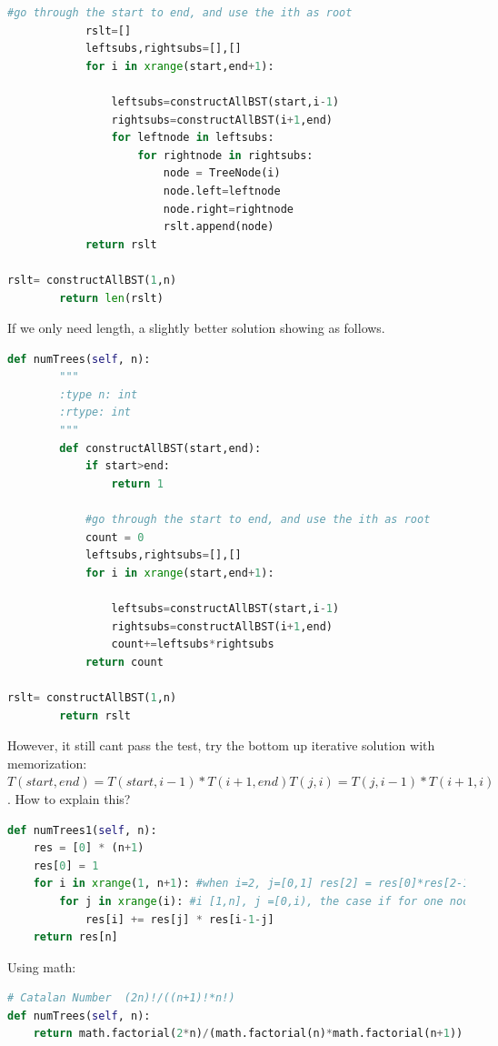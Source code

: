 \documentclass[../main.tex]{subfiles}
\begin{document}
\begin{examples}[resume]
\begin{lstlisting}[language = Python]
            #go through the start to end, and use the ith as root
            rslt=[]
            leftsubs,rightsubs=[],[]
            for i in xrange(start,end+1):
                
                leftsubs=constructAllBST(start,i-1)
                rightsubs=constructAllBST(i+1,end)
                for leftnode in leftsubs:
                    for rightnode in rightsubs:
                        node = TreeNode(i)
                        node.left=leftnode
                        node.right=rightnode
                        rslt.append(node)
            return rslt

rslt= constructAllBST(1,n)
        return len(rslt)
        \end{lstlisting}

If we only need length, a slightly better solution showing as follows.
\begin{lstlisting}[language = Python]
def numTrees(self, n):
        """
        :type n: int
        :rtype: int
        """
        def constructAllBST(start,end):
            if start>end:
                return 1
            
            #go through the start to end, and use the ith as root
            count = 0
            leftsubs,rightsubs=[],[]
            for i in xrange(start,end+1):
                
                leftsubs=constructAllBST(start,i-1)
                rightsubs=constructAllBST(i+1,end)
                count+=leftsubs*rightsubs
            return count

rslt= constructAllBST(1,n)
        return rslt
 \end{lstlisting}

However, it still cant pass the test, try the bottom up iterative solution with memorization: $T(start,end)=T(start,i-1)*T(i+1,end) T(j,i)=T(j,i-1)*T(i+1,i)$. How to explain this?
\begin{lstlisting}[language = Python]
def numTrees1(self, n):
    res = [0] * (n+1)
    res[0] = 1
    for i in xrange(1, n+1): #when i=2, j=[0,1] res[2] = res[0]*res[2-1-0] + res[1]*res[2-1-1] 
        for j in xrange(i): #i [1,n], j =[0,i), the case if for one node, 
            res[i] += res[j] * res[i-1-j]
    return res[n]
\end{lstlisting}
Using math:
\begin{lstlisting}[language = Python]
# Catalan Number  (2n)!/((n+1)!*n!)  
def numTrees(self, n):
    return math.factorial(2*n)/(math.factorial(n)*math.factorial(n+1))
\end{lstlisting}

\end{examples}
\end{document}
